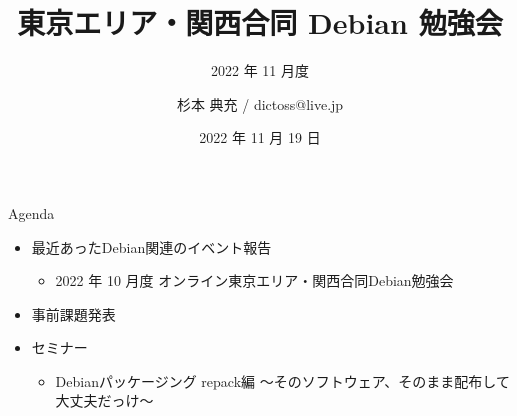 \title{東京エリア・関西合同 Debian 勉強会}
\subtitle{2022 年 11 月度} %
\author{杉本 典充 / dictoss@live.jp}
\date{2022 年 11 月 19 日}



\begin{frame}
\titlepage{}
\end{frame}

\begin{frame}{Agenda}
 \begin{minipage}[t]{0.45\hsize}
  \begin{itemize}
  \item 最近あったDebian関連のイベント報告
    \begin{itemize}
    \item 2022 年 10 月度 オンライン東京エリア・関西合同Debian勉強会
    \end{itemize}
  \item 事前課題発表
  \end{itemize}
 \end{minipage}
 \begin{minipage}[t]{0.45\hsize}
   \begin{itemize}
   \item セミナー
     \begin{itemize}
     \item Debianパッケージング repack編 ～そのソフトウェア、そのまま配布して大丈夫だっけ～
     \end{itemize}
  \end{itemize}
 \end{minipage}
\end{frame}

